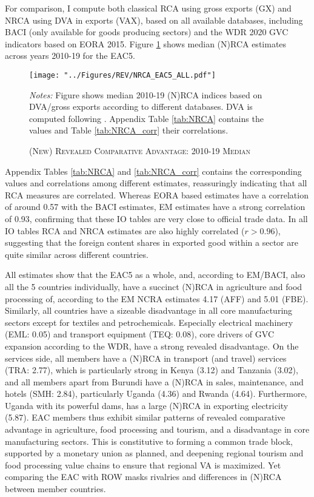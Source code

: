 \documentclass[a4paper]{article}
\begin{document}
For comparison, I compute both classical RCA using gross exports (GX) and NRCA using DVA in exports (VAX), based on all available databases, including BACI (only available for goods producing sectors) and the WDR 2020 GVC indicators based on EORA 2015. Figure \ref{fig:NRCA} shows median (N)RCA estimates across years 2010-19 for the EAC5. 
%
\begin{figure}[h!]
\centering
\caption{\label{fig:NRCA}\textsc{(New) Revealed Comparative Advantage: 2010-19 Median}}
\texttt{[image: "../Figures/REV/NRCA\_EAC5\_ALL.pdf"]} %
\raggedright
\scriptsize
\emph{Notes:} Figure shows median 2010-19 (N)RCA indices based on DVA/gross exports according to different databases. DVA is computed following \citet{borin2019measuring}. Appendix Table \ref{tab:NRCA} contains the values and Table \ref{tab:NRCA_corr} their correlations.
\end{figure}
\FloatBarrier
%
Appendix Tables \ref{tab:NRCA} and \ref{tab:NRCA_corr} contains the corresponding values and correlations among different estimates, %
reassuringly indicating that all RCA measures are correlated. Whereas EORA based estimates have a correlation of around 0.57 with the BACI estimates, EM estimates have a strong correlation of 0.93, confirming that these IO tables are very close to official trade data. In all IO tables RCA and NRCA estimates are also highly correlated ($r > 0.96$), suggesting that the foreign content shares in exported good within a sector are quite similar across different countries. \newline

All estimates show that the EAC5 as a whole, and, according to EM/BACI, also all the 5 countries individually, have a succinct (N)RCA in agriculture and food processing of, according to the EM NCRA estimates 4.17 (AFF) and 5.01 (FBE). Similarly, all countries have a sizeable disadvantage in all core manufacturing sectors except for textiles and petrochemicals. Especially electrical machinery (EML: 0.05) and transport equipment (TEQ: 0.08), core drivers of GVC expansion according to the WDR, have a strong revealed disadvantage. On the services side, all members have a (N)RCA in transport (and travel) services (TRA: 2.77), which is particularly strong in Kenya (3.12) and Tanzania (3.02), and all members apart from Burundi have a (N)RCA in sales, maintenance, and hotels (SMH: 2.84), particularly Uganda (4.36) and Rwanda (4.64). Furthermore, Uganda with its powerful dams, has a large (N)RCA in exporting electricity (5.87). EAC members thus exhibit similar patterns of revealed comparative advantage in agriculture, food processing and tourism, and a disadvantage in core manufacturing sectors. This is constitutive to forming a common trade block, supported by a monetary union as planned, and deepening regional tourism and food processing value chains to ensure that regional VA is maximized. Yet comparing the EAC with ROW masks rivalries and differences in (N)RCA between member countries. 
\end{document}
